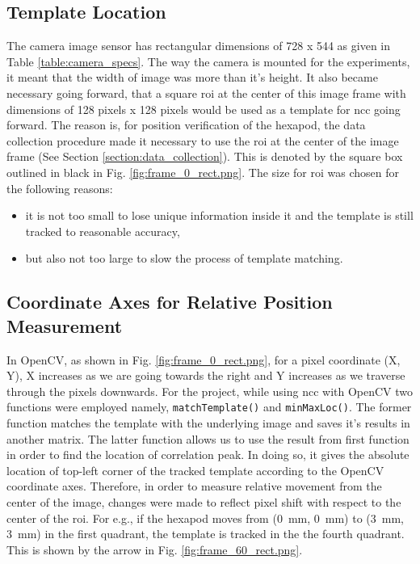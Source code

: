     \subsection*{Template Location}
        The camera image sensor has rectangular dimensions of 728 x 544 as given in Table \ref{table:camera_specs}. The way the camera is mounted for the experiments, it meant that the width of image was more than it's height. It also became necessary going forward, that a square \gls{roi} at the center of this image frame with dimensions of 128 pixels x 128 pixels would be used as a template for \gls{ncc} going forward. The reason is, for position verification of the hexapod, the data collection procedure made it necessary to use the \gls{roi} at the center of the image frame (See Section \ref{section:data_collection}). This is denoted by the square box outlined in black in Fig. \ref{fig:frame_0_rect.png}. The size for \gls{roi} was chosen for the following reasons:
        \begin{itemize}
            \item it is not too small to lose unique information inside it and the template is still tracked to reasonable accuracy,
            \item but also not too large to slow the process of template matching.
        \end{itemize}
        
    \subsection*{Coordinate Axes for Relative Position Measurement}
        In OpenCV, as shown in Fig. \ref{fig:frame_0_rect.png}, for a pixel coordinate (X, Y), X increases as we are going towards the right and Y increases as we traverse through the pixels downwards. For the project, while using \gls{ncc} with OpenCV two functions were employed namely, \texttt{matchTemplate()} and \texttt{minMaxLoc()}. The former function matches the template with the underlying image and saves it's results in another matrix. The latter function allows us to use the result from first function in order to find the location of correlation peak. In doing so, it gives the absolute location of top-left corner of the tracked template according to the OpenCV coordinate axes. Therefore, in order to measure relative movement from the center of the image, changes were made to reflect pixel shift with respect to the center of the \gls{roi}. For e.g., if the hexapod moves from (\SI{0}{\milli\meter}, \SI{0}{\milli\meter}) to (\SI{3}{\milli\meter}, \SI{3}{\milli\meter}) in the first quadrant, the template is tracked in the the fourth quadrant. This is shown by the arrow in Fig. \ref{fig:frame_60_rect.png}. 


